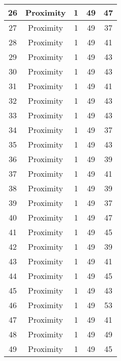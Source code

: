 \documentclass[results.tex]{subfiles}
\begin{document}
\begin{center}
\begin{tabular}{| c || c | c | c | c |}
    \hline
    26 & Proximity & 1 & 49 & 47 \\ 
    \hline
    27 & Proximity & 1 & 49 & 37 \\ 
    \hline
    28 & Proximity & 1 & 49 & 41 \\ 
    \hline
    29 & Proximity & 1 & 49 & 43 \\ 
    \hline
    30 & Proximity & 1 & 49 & 43 \\ 
    \hline
    31 & Proximity & 1 & 49 & 41 \\ 
    \hline
    32 & Proximity & 1 & 49 & 43 \\ 
    \hline
    33 & Proximity & 1 & 49 & 43 \\ 
    \hline
    34 & Proximity & 1 & 49 & 37 \\ 
    \hline
    35 & Proximity & 1 & 49 & 43 \\ 
    \hline
    36 & Proximity & 1 & 49 & 39 \\ 
    \hline
    37 & Proximity & 1 & 49 & 41 \\ 
    \hline
    38 & Proximity & 1 & 49 & 39 \\ 
    \hline
    39 & Proximity & 1 & 49 & 37 \\ 
    \hline
    40 & Proximity & 1 & 49 & 47 \\ 
    \hline
    41 & Proximity & 1 & 49 & 45 \\ 
    \hline
    42 & Proximity & 1 & 49 & 39 \\ 
    \hline
    43 & Proximity & 1 & 49 & 41 \\ 
    \hline
    44 & Proximity & 1 & 49 & 45 \\ 
    \hline
    45 & Proximity & 1 & 49 & 43 \\ 
    \hline
    46 & Proximity & 1 & 49 & 53 \\ 
    \hline
    47 & Proximity & 1 & 49 & 41 \\ 
    \hline
    48 & Proximity & 1 & 49 & 49 \\ 
    \hline
    49 & Proximity & 1 & 49 & 45 \\ 
    \hline   \end{tabular}
\end{center}
\end{document}
